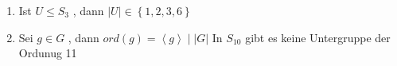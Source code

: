 \documentclass[a4paper]{memoir}
\begin{document}
\begin{enumerate}[label=\alph*)]
    \item Ist $ U \leq S_3 $ , dann $ \left| U \right| \in 
        \left\{ 1,2,3,6 \right\}  $ 
    \item Sei $ g \in G $ , dann $ ord\left( g \right) = \left<g \right> \mid 
        \left| G \right| $ In $ S_10 $ gibt es keine Untergruppe der Ordunug 11
\end{enumerate}
\textit{}

\printindex
\end{document}

